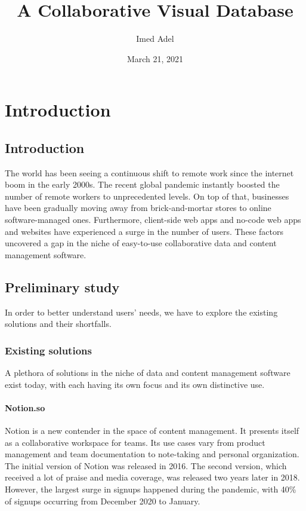 \documentclass[
  12pt,
  a4paper,
]{article}
\title{A Collaborative Visual Database}
\author{Imed Adel}
\date{March 21, 2021}
\begin{document}
\maketitle

\hypertarget{introduction}{%
\section{Introduction}\label{introduction}}

\hypertarget{introduction-1}{%
\subsection{Introduction}\label{introduction-1}}

The world has been seeing a continuous shift to remote work since the
internet boom in the early 2000s. The recent global pandemic instantly
boosted the number of remote workers to unprecedented levels. On top of
that, businesses have been gradually moving away from brick-and-mortar
stores to online software-managed ones. Furthermore, client-side web
apps and no-code web apps and websites have experienced a surge in the
number of users. These factors uncovered a gap in the niche of
easy-to-use collaborative data and content management software.

\hypertarget{preliminary-study}{%
\subsection{Preliminary study}\label{preliminary-study}}

In order to better understand users' needs, we have to explore the
existing solutions and their shortfalls.

\hypertarget{existing-solutions}{%
\subsubsection{Existing solutions}\label{existing-solutions}}

A plethora of solutions in the niche of data and content management
software exist today, with each having its own focus and its own
distinctive use.

\hypertarget{notion.so}{%
\paragraph{Notion.so}\label{notion.so}}

Notion is a new contender in the space of content management. It
presents itself as a collaborative workspace for teams. Its use cases
vary from product management and team documentation to note-taking and
personal organization. The initial version of Notion was released in
2016. The second version, which received a lot of praise and media
coverage, was released two years later in 2018. However, the largest
surge in signups happened during the pandemic, with 40\% of signups
occurring from December 2020 to January.
\end{document}

